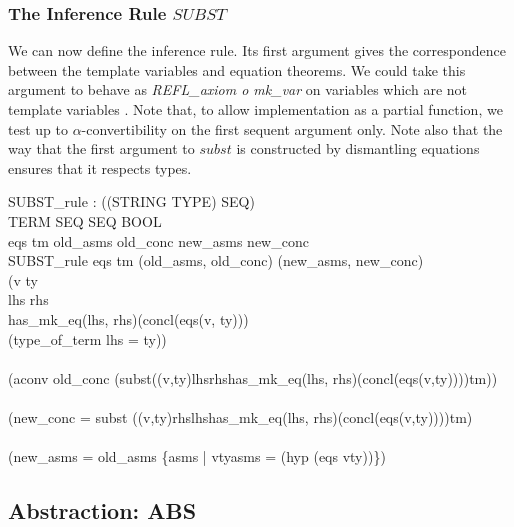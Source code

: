 \documentclass[a4paper,11pt,titlepage]{article}
\begin{document}
\begin{titlepage}
\subsubsection{The Inference Rule $SUBST$}
We can now define the inference rule.
Its first argument gives the correspondence between the
template variables and equation theorems.
We could take this argument to
behave as {\it REFL\_axiom o mk\_var} on variables which
are not template variables .
Note that, to allow implementation as a partial function,
we test up to $\alpha$-convertibility on the first
sequent argument only.
Note also that the way that the first argument to $subst$
is constructed by dismantling equations ensures that
it respects types.
\begin{HOLConst}
\+	\PrNL{}SUBST\_rule\PrNN{} : ((STRING \MMM{\times} TYPE) \MMM{\rightarrow} SEQ) \MMM{\rightarrow}\\
\+			TERM \MMM{\rightarrow} SEQ \MMM{\rightarrow} SEQ \MMM{\rightarrow} BOOL\\
\PrPH{}
\+	\MMM{\forall} eqs tm old\_asms old\_conc new\_asms  new\_conc\MMM{\bullet}\\
\+	SUBST\_rule eqs tm (old\_asms, old\_conc) (new\_asms, new\_conc) \MMM{\Leftrightarrow}\\
\+	(\MMM{\forall}v ty \MMM{\bullet}\\
\+		\MMM{\exists}lhs rhs\MMM{\bullet}\\
\+		has\_mk\_eq(lhs, rhs)(concl(eqs(v, ty))) \MMM{\land}\\
\+		(type\_of\_term lhs = ty))\\
\+	\MMM{\land}\\
\+	(aconv old\_conc (subst(\MMM{\lambda}(v,ty)\MMM{\bullet}\MMM{\epsilon}lhs\MMM{\bullet}\MMM{\exists}rhs\MMM{\bullet}has\_mk\_eq(lhs, rhs)(concl(eqs(v,ty))))tm))\\
\+	\MMM{\land}\\
\+	(new\_conc = subst (\MMM{\lambda}(v,ty)\MMM{\bullet}\MMM{\epsilon}rhs\MMM{\bullet}\MMM{\exists}lhs\MMM{\bullet}has\_mk\_eq(lhs, rhs)(concl(eqs(v,ty))))tm)\\
\+	\MMM{\land}\\
\+	(new\_asms = old\_asms \MMM{\cup} \MMM{\bigcup} \{asms | \MMM{\exists}vty\MMM{\bullet}asms = (hyp (eqs vty))\})\\
\end{HOLConst}

\subsection{Abstraction: ABS}


\end{titlepage}
\end{document}

